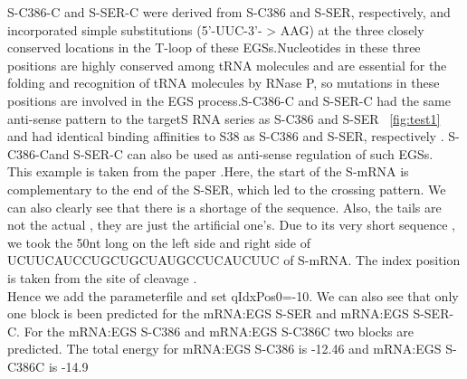 \documentclass[twoside,a4paper]{report}
\begin{document}
	  S-C386-C and S-SER-C were derived from S-C386 and S-SER, respectively, and incorporated simple substitutions (5'-UUC-3'- > AAG) at the three closely conserved locations in the T-loop of these EGSs.Nucleotides in these three positions are highly conserved among tRNA molecules and are essential for the folding and recognition of tRNA molecules by RNase P, so mutations in these positions are involved in the EGS process.S-C386-C and S-SER-C had the same anti-sense pattern to the targetS RNA series as S-C386 and S-SER ~\ref{fig:test1}  and had identical binding affinities to S38 as S-C386 and S-SER, respectively . S-C386-Cand S-SER-C can also be used as anti-sense regulation of such EGSs.\\
	 
	This example is taken from the paper{\citep{zhang2013engineered}}  .Here, the start of the S-mRNA is complementary to the end of the S-SER, which led to the crossing pattern. We can also clearly see that there is a shortage of the sequence. Also, the tails are not the actual , they are just the artificial one's. Due to its very short sequence , we took the 50nt long on the left side and right side of UCUUCAUCCUGCUGCUAUGCCUCAUCUUC of S-mRNA. The index position is taken from the site of cleavage .\\
	
	 Hence we add the parameterfile and set qIdxPos0=-10. We can also see that only one block is been predicted for the mRNA:EGS S-SER and mRNA:EGS S-SER-C. For the mRNA:EGS S-C386 and mRNA:EGS S-C386C two blocks are predicted. The total energy for mRNA:EGS S-C386 is -12.46 and mRNA:EGS S-C386C is -14.9  \\
	 
	
	
	
	
\end{document}
